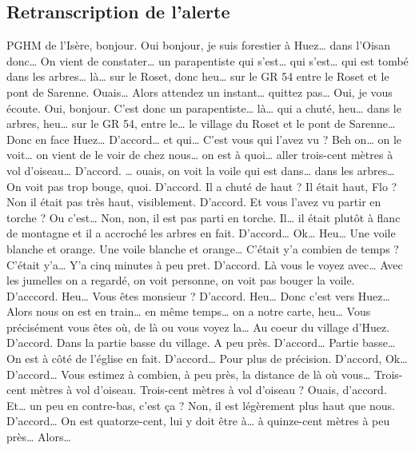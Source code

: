\subsection{Retranscription de l'alerte}
\begin{dialogue}
   PGHM de l'Isère, bonjour.
  \Req Oui bonjour, je suis forestier
  à Huez… dans l'Oisan donc… On vient de constater… un parapentiste qui s'est… qui s'est… qui est tombé dans les arbres… là… sur le Roset, donc heu… sur le GR 54 entre le Roset et le pont de Sarenne.
   Ouais… Alors attendez un instant… quittez pas…
  \Sec Oui, je vous écoute.
  \Req Oui, bonjour. C'est donc un parapentiste… là… qui a chuté, heu… dans le arbres, heu… sur le GR 54, entre le… le village du Roset et le pont de Sarenne… Donc en face Huez…
  \Sec D'accord… et qui… C'est vous qui l'avez vu ?
  \Req Beh on… on le voit… on vient de le voir de chez nous… on est à quoi… aller trois-cent mètres à vol d'oiseau…
  \Sec D'accord.
  \Req … ouais, on voit la voile qui est dans… dans les arbres… On voit pas trop bouge, quoi.
  \Sec D'accord. Il a chuté de haut ?
  \Req {} Il était haut, Flo ?
   Non il était pas très haut, visiblement.
  \Sec D'accord. Et vous l'avez vu partir en torche ? Ou c'est…
  \Req Non, non, il est pas parti en torche. Il… il était plutôt à flanc de montagne et il a accroché les arbres en fait.
  \Sec D'accord… Ok… Heu…
  \Req Une voile blanche et orange.
  \Sec Une voile blanche et orange… C'était y'a combien de temps ?
  \Req C'était y'a… Y'a cinq minutes à peu pret.
  \Sec D'accord. Là vous le voyez avec…
  \Req Avec les jumelles on a regardé, on voit personne, on voit pas bouger la voile.
  \Sec D'acccord. Heu… Vous êtes monsieur ?
  \Req {}
  \Sec D'accord. Heu… Donc c'est vers Huez… Alors nous on est en train… en même temps… on a notre carte, heu… Vous précisément vous êtes où, de là ou vous voyez la…
  \Req Au coeur du village d'Huez.
  \Sec D'accord.
  \Req Dans la partie basse du village. A peu près.
  \Sec D'accord…  Partie basse…
  \Req On est à côté de l'église en fait.
  \Sec D'accord…
  \Req Pour plus de précision.
  \Sec D'accord, Ok… D'accord… Vous estimez à combien, à peu près, la distance de là où vous…
  \Req Trois-cent mètres à vol d'oiseau.
  \Sec Trois-cent mètres à vol d'oiseau ? Ouais, d'accord. Et… un peu en contre-bas, c'est ça ?
  \Req Non, il est légèrement plus haut que nous.
  \Sec D'accord…
  \Req On est quatorze-cent, lui y doit être à… à quinze-cent mètres à peu près…
  \Sec Alors…

\end{dialogue}
